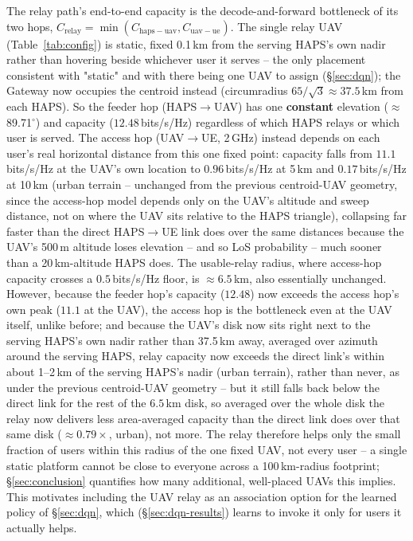 \documentclass[]{ieeeaccess}
\begin{document}
The relay path's end-to-end capacity is the decode-and-forward bottleneck of its two hops, $C_\mathrm{relay}=\min(C_\mathrm{haps-uav},C_\mathrm{uav-ue})$. The single relay UAV (Table~\ref{tab:config}) is static, fixed 0.1\,km from the serving HAPS's own nadir rather than hovering beside whichever user it serves -- the only placement consistent with "static" and with there being one UAV to assign (\S\ref{sec:dqn}); the Gateway now occupies the centroid instead (circumradius $65/\sqrt{3}\approx37.5$\,km from each HAPS). So the feeder hop (HAPS$\to$UAV) has one \textbf{constant} elevation ($\approx$89.71$^\circ$) and capacity ($12.48$\,bits/s/Hz) regardless of which HAPS relays or which user is served. The access hop (UAV$\to$UE, 2\,GHz) instead depends on each user's real horizontal distance from this one fixed point: capacity falls from $11.1$\,bits/s/Hz at the UAV's own location to $0.96$\,bits/s/Hz at 5\,km and $0.17$\,bits/s/Hz at 10\,km (urban terrain -- unchanged from the previous centroid-UAV geometry, since the access-hop model depends only on the UAV's altitude and sweep distance, not on where the UAV sits relative to the HAPS triangle), collapsing far faster than the direct HAPS$\to$UE link does over the same distances because the UAV's 500\,m altitude loses elevation -- and so LoS probability -- much sooner than a 20\,km-altitude HAPS does. The usable-relay radius, where access-hop capacity crosses a $0.5$\,bits/s/Hz floor, is $\approx6.5$\,km, also essentially unchanged. However, because the feeder hop's capacity ($12.48$) now exceeds the access hop's own peak ($11.1$ at the UAV), the access hop is the bottleneck even at the UAV itself, unlike before; and because the UAV's disk now sits right next to the serving HAPS's own nadir rather than 37.5\,km away, averaged over azimuth around the serving HAPS, relay capacity now exceeds the direct link's within about 1--2\,km of the serving HAPS's nadir (urban terrain), rather than never, as under the previous centroid-UAV geometry -- but it still falls back below the direct link for the rest of the $6.5$\,km disk, so averaged over the whole disk the relay now delivers less area-averaged capacity than the direct link does over that same disk ($\approx0.79\times$, urban), not more. The relay therefore helps only the small fraction of users within this radius of the one fixed UAV, not every user -- a single static platform cannot be close to everyone across a 100\,km-radius footprint; \S\ref{sec:conclusion} quantifies how many additional, well-placed UAVs this implies. This motivates including the UAV relay as an association option for the learned policy of \S\ref{sec:dqn}, which (\S\ref{sec:dqn-results}) learns to invoke it only for users it actually helps.
\end{document}
